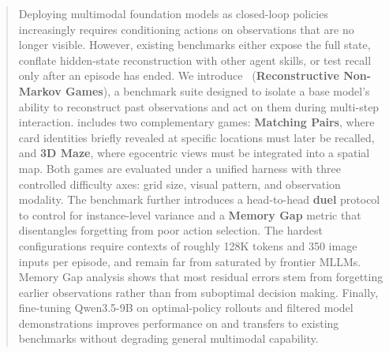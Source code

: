 \begin{abstract}


Deploying multimodal foundation models as closed-loop policies increasingly requires conditioning actions on observations that are no longer visible. 
However, existing benchmarks either expose the full state, conflate hidden-state reconstruction with other agent skills, or test recall only after an episode has ended. 
We introduce \textbf{\benchname{}}~(\textbf{Reconstructive Non-Markov Games}), 
a benchmark suite designed to isolate a base model’s ability to reconstruct past observations and act on them during multi-step interaction. 
\benchname{} includes two complementary games: \textbf{Matching Pairs}, where card identities briefly revealed at specific locations must later be recalled, 
and \textbf{3D Maze}, where egocentric views must be integrated into a spatial map. 
Both games are evaluated under a unified harness with three controlled difficulty axes: grid size, visual pattern, and observation modality. 
The benchmark further introduces a head-to-head \textbf{duel} protocol to control for instance-level variance and a \textbf{Memory Gap} metric that disentangles forgetting from poor action selection. 
The hardest configurations require contexts of roughly 128K tokens and 350 image inputs per episode, and remain far from saturated by frontier MLLMs. 
Memory Gap analysis shows that most residual errors stem from forgetting earlier observations rather than from suboptimal decision making. 
Finally, fine-tuning Qwen3.5-9B on optimal-policy rollouts and filtered model demonstrations improves performance on \benchname{} and transfers to existing benchmarks without degrading general multimodal capability.

\end{abstract}
